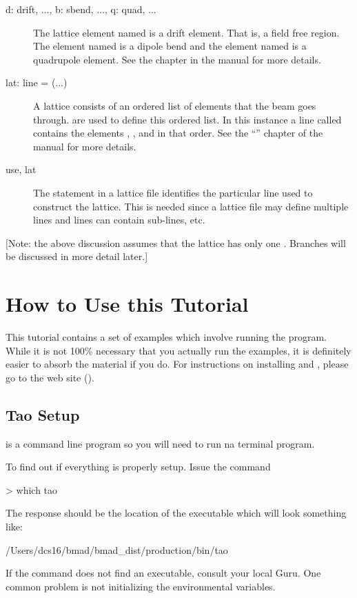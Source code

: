 \documentclass{hitec}
\newcommand{\Section}[1]{\section{#1}\vspace*{-1ex}}
\begin{document}
\begin{description}
  \item[d: drift, ..., b: sbend, ..., q: quad, ...] \Newline
The lattice element named  is a drift element. That is, a field free region. The element named 
is a dipole bend and the element named  is a quadrupole element. See the 
chapter in the \bmad manual for more details.
  \item[lat: line = (...)] \Newline
A lattice consists of an ordered list of elements that the beam goes through.  are used
to define this ordered list. In this instance a line called  contains the elements
, , and  in that order. 
See the ``'' chapter of the \bmad manual for more details.
  \item[use, lat] \Newline
The  statement in a lattice file identifies the particular line used to construct the
lattice. This is needed since a lattice file may define multiple lines and lines can contain
sub-lines, etc.
  \end{description}

[Note: the above discussion assumes that the lattice has only one . Branches will be
discussed in more detail later.]

\newpage

\Section{How to Use this Tutorial}

This tutorial contains a set of examples which involve running the \tao program.  While it is not
100\% necessary that you actually run the examples, it is definitely easier to absorb the material
if you do. For instructions on installing \bmad and \tao, please go to the \bmad web site
().

\subsection{Tao Setup}

\tao is a command line program so you will need to run na terminal program.

To find out if everything is properly setup. Issue the command
\begin{code}
> which tao
\end{code}
The response should be the location of the \tao executable which will look something like:
\begin{code}
/Users/dcs16/bmad/bmad_dist/production/bin/tao
\end{code}
If the  command does not find an executable, consult your local \bmad Guru. One common
problem is not initializing the \bmad environmental variables.
\end{document}
